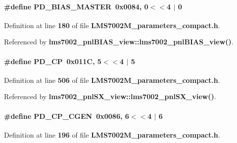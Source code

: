 \paragraph[{P\+D\+\_\+\+B\+I\+A\+S\+\_\+\+M\+A\+S\+T\+ER}]{\setlength{\rightskip}{0pt plus 5cm}\#define P\+D\+\_\+\+B\+I\+A\+S\+\_\+\+M\+A\+S\+T\+ER~0x0084, 0$<$$<$4 $\vert$  0}\label{LMS7002M__parameters__compact_8h_ad7f397ce86a9f3c862e341de8dc4475e}


Definition at line {\bf 180} of file {\bf L\+M\+S7002\+M\+\_\+parameters\+\_\+compact.\+h}.



Referenced by {\bf lms7002\+\_\+pnl\+B\+I\+A\+S\+\_\+view\+::lms7002\+\_\+pnl\+B\+I\+A\+S\+\_\+view()}.

\paragraph[{P\+D\+\_\+\+CP}]{\setlength{\rightskip}{0pt plus 5cm}\#define P\+D\+\_\+\+CP~0x011\+C, 5$<$$<$4 $\vert$  5}\label{LMS7002M__parameters__compact_8h_a6eee0ddd2ba487903e62158e0c94cc4b}


Definition at line {\bf 506} of file {\bf L\+M\+S7002\+M\+\_\+parameters\+\_\+compact.\+h}.



Referenced by {\bf lms7002\+\_\+pnl\+S\+X\+\_\+view\+::lms7002\+\_\+pnl\+S\+X\+\_\+view()}.

\paragraph[{P\+D\+\_\+\+C\+P\+\_\+\+C\+G\+EN}]{\setlength{\rightskip}{0pt plus 5cm}\#define P\+D\+\_\+\+C\+P\+\_\+\+C\+G\+EN~0x0086, 6$<$$<$4 $\vert$  6}\label{LMS7002M__parameters__compact_8h_a1bb37c4e679a1c2715f4806b60e2beb0}


Definition at line {\bf 196} of file {\bf L\+M\+S7002\+M\+\_\+parameters\+\_\+compact.\+h}.




